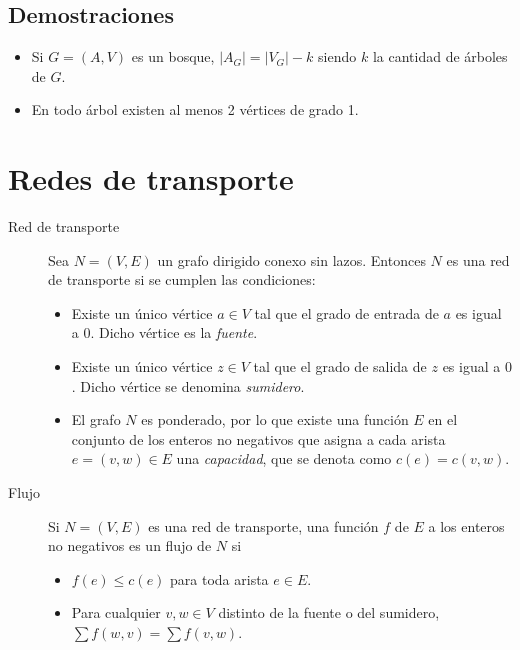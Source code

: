 \documentclass[a4paper, twoside]{article}
\begin{document}
\subsection{Demostraciones}
\begin{itemize}
	\item Si $G=(A,V)$ es un bosque, $|A_G| = |V_G| - k$ siendo $k$ la cantidad de árboles de $G$.
	\item En todo árbol existen al menos 2 vértices de grado 1.
\end{itemize}

\newpage
\section{Redes de transporte}
\begin{description}
	\item[Red de transporte] Sea $N = (V,E)$ un grafo dirigido conexo sin lazos. 
	Entonces $N$ es una red de transporte si se cumplen las condiciones:
	
    \begin {itemize}

        \item Existe un único vértice $a \in V$ tal que el grado de entrada
	de $a$ es igual a $0$. Dicho vértice es la \emph{fuente}.
 
        \item Existe un único vértice $z \in V$ tal que el grado de salida
        de $z$ es igual a $0$. Dicho vértice se denomina \emph{sumidero}.

        \item El grafo $N$ es ponderado, por lo que existe una función $E$
        en el conjunto de los enteros no negativos que asigna a cada arista 
        $e = (v,w) \in E$ una \emph{capacidad}, que se denota como $c(e) = c(v,w)$.
		
	\end{itemize}

	\item[Flujo] Si $N = (V,E)$ es una red de transporte, una función $f$ de $E$
        a los enteros no negativos es un flujo de $N$ si
        \begin{itemize}
          \item $f(e) \le c(e)$ para toda arista $e \in E$.

          \item Para cualquier $v,w \in V$ distinto de la fuente o del sumidero, 
          $\sum f(w,v) = \sum f(v,w)$.
        \end{itemize}


\end{description}
\end{document}
